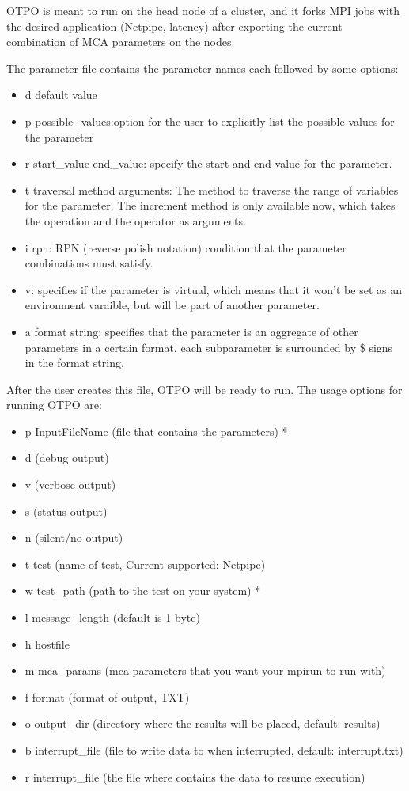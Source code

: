 OTPO is meant to run on the head node of a cluster, and it forks MPI jobs with
the desired application (Netpipe, latency) after exporting the current
combination of MCA parameters on the nodes.

The parameter file contains the parameter names each followed by some options:
\begin{itemize}
\item d default value
\item p {possible\_values}:option for the user to explicitly list the possible
  values for the parameter
\item r start\_value end\_value: specify the start and end value for the
  parameter.
\item t traversal method arguments: The method to traverse the range of
  variables for the parameter. The increment method is only available now,
  which takes the operation and the operator as arguments.
\item i rpn: RPN (reverse polish notation) condition that the parameter
  combinations must satisfy.
\item v: specifies if the parameter is virtual, which means that it won't be
  set as an environment varaible, but will be part of another parameter.
\item a {format string}: specifies that the parameter is an aggregate of
  other parameters in a certain format. each subparameter is surrounded by \$
  signs in the format string.
\end{itemize}

After the user creates this file, OTPO will be ready to run. The usage options
for running OTPO are:
\begin{itemize}
\item p InputFileName (file that contains the parameters) *
\item d (debug output)
\item v (verbose output)
\item s (status output)
\item n (silent/no output)
\item t test (name of test, Current supported: Netpipe)
\item w test\_path (path to the test on your system) *
\item l message\_length (default is 1 byte)
\item h hostfile
\item m mca\_params (mca parameters that you want your mpirun to run with)
\item f format (format of output, TXT)
\item o output\_dir (directory where the results will be placed, default: results)
\item b interrupt\_file (file to write data to when interrupted, default:
  interrupt.txt)
\item r interrupt\_file (the file where contains the data to resume execution) 
\end{itemize}

